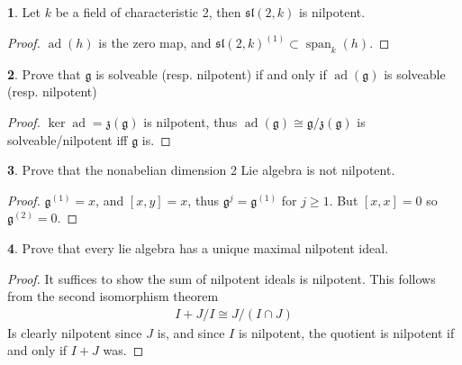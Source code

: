 \documentclass[10.5pt]{article}
\theoremstyle{definition}
\newtheorem{pb}{}
\numberwithin{example}{subsection}
\numberwithin{proposition}{subsection}
\numberwithin{pb}{subsection}
\begin{document}
        \begin{pb}
            Let \(k\) be a field of characteristic 2, then \(\mathfrak{sl}(2,k)\) is nilpotent.

            \begin{proof}
                \(\operatorname{ad}(h)\) is the zero map, and \(\mathfrak{sl}(2,k)^{(1)} \subset \operatorname{span}_k(h)\).
            \end{proof}
        \end{pb}

        \begin{pb}
            Prove that \(\mathfrak{g}\) is solveable (resp. nilpotent) if and only if \(\operatorname{ad}(\mathfrak{g})\) is solveable (resp. nilpotent)

            \begin{proof}
                \(\ker \operatorname{ad} = \mathfrak{z}(\mathfrak{g})\) is nilpotent, thus \(\operatorname{ad}(\mathfrak{g}) \cong \mathfrak{g}/\mathfrak{z}(\mathfrak{g})\) is solveable/nilpotent iff \(\mathfrak{g}\) is.
            \end{proof}
        \end{pb}

        \begin{pb}
            Prove that the nonabelian dimension 2 Lie algebra is not nilpotent.

            \begin{proof}
                \(\mathfrak{g}^{(1)} = x\), and \([x,y] = x\), thus \(\mathfrak{g}^j = \mathfrak{g}^{(1)}\) for \(j \geq 1\). But \([x,x] = 0\) so \(\mathfrak{g}^{(2)} = 0\).
            \end{proof}
        \end{pb}

        \begin{pb}
            Prove that every lie algebra has a unique maximal nilpotent ideal.

            \begin{proof}
                It suffices to show the sum of nilpotent ideals is nilpotent. This follows from the second isomorphism theorem
                \begin{align}
                    I + J/I \cong J/(I\cap J)
                \end{align}
                Is clearly nilpotent since \(J\) is, and since \(I\) is nilpotent, the quotient is nilpotent if and only if \(I + J\) was.
            \end{proof}
        \end{pb}
\end{document}
